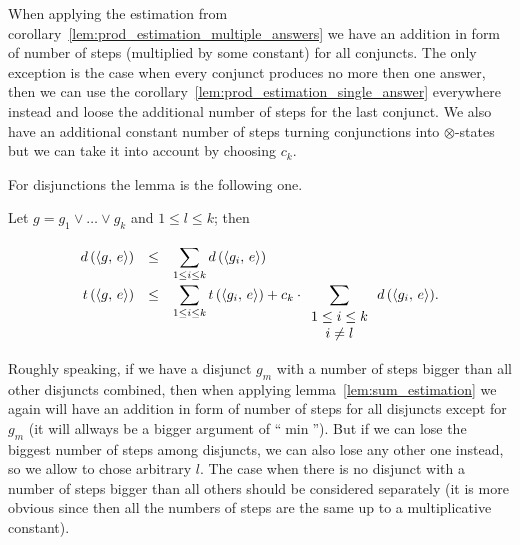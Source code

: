 When applying the estimation from corollary~\ref{lem:prod_estimation_multiple_answers} we have an addition in form of number of steps (multiplied by some constant) for all conjuncts. The only exception is the case when every conjunct produces no more then one answer, then we can use the corollary~\ref{lem:prod_estimation_single_answer} everywhere instead and loose the additional number of steps for the last conjunct. We also have an additional constant number of steps turning conjunctions into $\otimes$-states but we can take it into account by choosing $c_k$.

For disjunctions the lemma is the following one.

\begin{lemma}
\label{lem:disjunction_metrics_calc}

Let $g = g_1 \lor \dots \lor g_k$ and $1 \le l \le k$; then

\[
\renewcommand{\arraystretch}{1.5}
\begin{array}{rcl}
  d\,(\taskst{g}{e}) &\le& \displaystyle\sum\limits_{1 \le i \le k} d\,(\taskst{g_i}{e}) \\
  t\,(\taskst{g}{e}) &\le& \displaystyle\sum\limits_{1 \le i \le k} t\,(\taskst{g_i}{e}) + c_k\cdot \displaystyle\sum\limits_{\renewcommand{\arraystretch}{1}\begin{array}{c}1 \le i \le k \\ i \ne l\end{array}} d\,(\taskst{g_i}{e}).
\end{array}
\]

\end{lemma}

Roughly speaking, if we have a disjunct $g_m$ with a number of steps bigger than all other disjuncts combined, then when applying lemma~\ref{lem:sum_estimation} we again will have an addition in form of number of steps for all disjuncts except for $g_m$ (it will allways be a bigger argument of ``$\min$''). But if we can lose the biggest number of steps among disjuncts, we can also lose any other one instead, so we allow to chose arbitrary $l$. The case when there is no disjunct with a number of steps bigger than all others should be considered separately (it is more obvious since then all the numbers of steps are the same up to a multiplicative constant).

